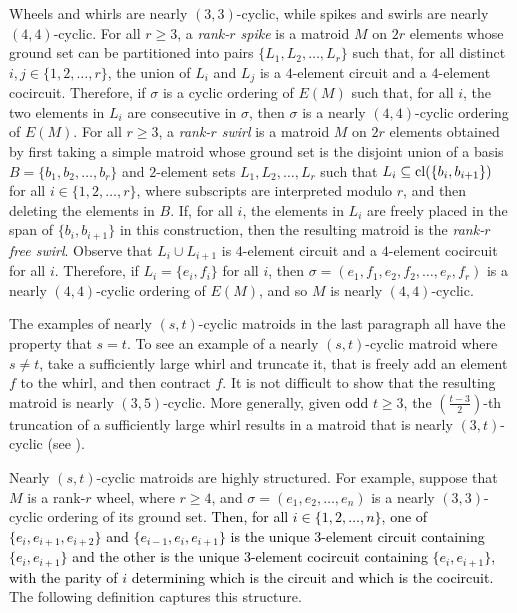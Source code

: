 \documentclass[11pt]{amsart}
\newcommand{\cl}{{\rm cl}}
\newcommand{\blue}{\textcolor{black}}
\newcommand{\bloo}{\textcolor{black}}
\begin{document}
Wheels and whirls are nearly $(3, 3)$-cyclic, while spikes and swirls are nearly $(4, 4)$-cyclic. For all $r\ge 3$, a {\em rank-$r$ spike} is a matroid $M$ on $2r$ elements whose ground set can be partitioned into pairs $\{L_1, L_2, \ldots, L_r\}$ such that, for all distinct $i, j\in \{1, 2, \ldots, r\}$, the union of $L_i$ and $L_j$ is a $4$-element circuit and a $4$-element cocircuit. Therefore, if $\sigma$ is a cyclic ordering of $E(M)$ such that, for all $i$, the two elements in $L_i$ are consecutive in $\sigma$, then $\sigma$ is a nearly $(4, 4)$-cyclic ordering of $E(M)$. For all $r\ge 3$, a {\em rank-$r$ swirl} is a matroid $M$ on $2r$ elements obtained by first taking a simple matroid whose ground set is the disjoint union of a basis $B=\{b_1, b_2, \ldots, b_r\}$ and $2$-element sets $L_1, L_2, \ldots, L_r$ such that $L_i\subseteq \cl(\{b_i, b_{i+1}\})$ for all $i\in \{1, 2, \ldots, r\}$, where subscripts are interpreted modulo $r$, and then deleting the elements in $B$. If, for all $i$, the elements in $L_i$ are freely placed in the span of $\{b_i, b_{i+1}\}$ in this construction, then the resulting matroid is the {\em rank-$r$ free swirl}. Observe that $L_i\cup L_{i+1}$ is $4$-element circuit and a $4$-element cocircuit for all $i$. Therefore, if $L_i=\{e_i, f_i\}$ for all $i$, then $\sigma=(e_1, f_1, e_2, f_2, \ldots, e_r, f_r)$ is a nearly $(4, 4)$-cyclic ordering of $E(M)$, and so $M$ is nearly $(4, 4)$-cyclic.

The examples of nearly $(s, t)$-cyclic matroids in the last paragraph all have the property that $s=t$. To see an example of a nearly $(s, t)$-cyclic matroid where $s\neq t$, take a sufficiently large whirl and truncate it, that is freely add an element $f$ to the whirl, and then contract $f$. It is not difficult to show that the resulting matroid is nearly $(3, 5)$-cyclic. More generally, given \blue{odd} $t\ge 3$, the $\left(\frac{t-3}{2}\right)$-th truncation of a sufficiently large whirl results in a matroid that is nearly $(3, t)$-cyclic (see ).

Nearly $(s, t)$-cyclic matroids are highly structured. For example, suppose that $M$ is a rank-$r$ wheel, where $r\ge 4$, and $\sigma=(e_1, e_2, \ldots, e_n)$ is a nearly $(3, 3)$-cyclic ordering of its ground set. \bloo{Then, for all $i\in \{1, 2, \ldots, n\}$, one of $\{e_i,e_{i+1},e_{i+2}\}$ and $\{e_{i-1},e_i,e_{i+1}\}$ is the unique $3$-element circuit containing $\{e_i,e_{i+1}\}$ and the other is the unique $3$-element cocircuit containing $\{e_i,e_{i+1}\}$, with the parity of $i$ determining which is the circuit and which is the cocircuit.} The following definition captures this structure.
\end{document}
